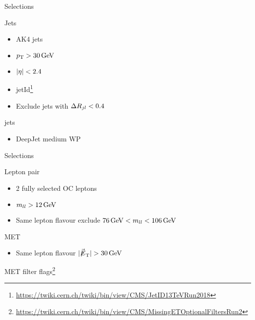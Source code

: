 \documentclass[18pt]{beamer}
\begin{document}
\begin{frame}{Selections}
	\begin{multicols}{2}
		Jets
		\begin{itemize}
			\item AK4 jets
			\item $p_{\text{T}}>\SI{30}{\giga\electronvolt}$
			\item $|\eta|<2.4$
			\item {} jetId\footnote{\url{https://twiki.cern.ch/twiki/bin/view/CMS/JetID13TeVRun2018}}
			\item Exclude jets with $\Delta R_{jl}<0.4$
		\end{itemize}
		\vfill\null
		\columnbreak
		\bottomquark jets
		\begin{itemize}
			\item DeepJet medium WP
		\end{itemize}	
	\end{multicols}	
\end{frame}

\begin{frame}{Selections}
	\begin{multicols}{2}
		Lepton pair
		\begin{itemize}
			\item 2 fully selected OC leptons
			\item $m_{ll}>\SI{12}{\giga\electronvolt}$
			\item Same lepton flavour exclude $\SI{76}{\giga\electronvolt}<m_{ll}<\SI{106}{\giga\electronvolt}$
		\end{itemize}
		\vfill\null
		\columnbreak
		MET
		\begin{itemize}
			\item Same lepton flavour $\abs{\met}>\SI{30}{\giga\electronvolt}$
		\end{itemize}	
	\end{multicols}	
\end{frame}

\begin{frame}{MET filter flags\footnote{\url{https://twiki.cern.ch/twiki/bin/view/CMS/MissingETOptionalFiltersRun2}}}
	
\end{frame}





% 
%
%
\end{document}
